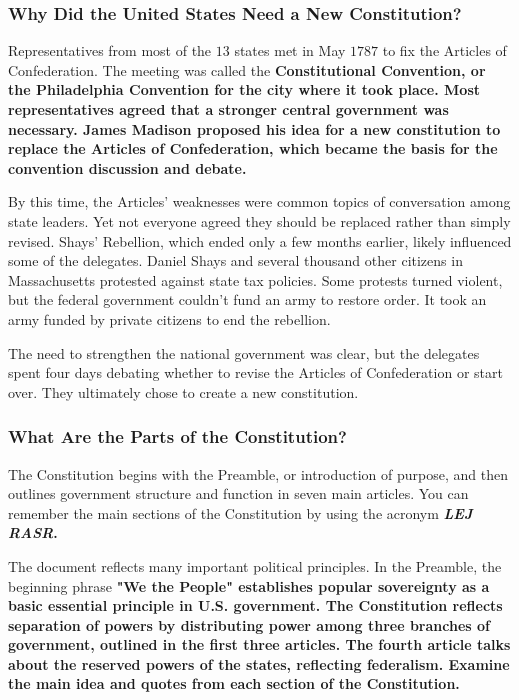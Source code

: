 \newpage

\subsubsection*{Why Did the United States Need a New Constitution?}

Representatives from most of the $13$ states met in May $1787$ to fix the Articles of Confederation. The meeting was called the
\bf{Constitutional Convention}, or the \bf{Philadelphia Convention} for the city where it took place. Most representatives agreed
that a stronger central government was necessary. James Madison proposed his idea for a new constitution to replace the Articles of
Confederation, which became the basis for the convention discussion and debate.

By this time, the Articles' weaknesses were common topics of conversation among state leaders. Yet not everyone agreed they should be
replaced rather than simply revised. Shays' Rebellion, which ended only a few months earlier, likely influenced some of the delegates.
Daniel Shays and several thousand other citizens in Massachusetts protested against state tax policies. Some protests turned violent, but
the federal government couldn't fund an army to restore order. It took an army funded by private citizens to end the rebellion.

The need to strengthen the national government was clear, but the delegates spent four days debating whether to revise the Articles of
Confederation or start over. They ultimately chose to create a new constitution.

\subsubsection*{What Are the Parts of the Constitution?}

The Constitution begins with the Preamble, or introduction of purpose, and then outlines government structure and function in seven main
articles. You can remember the main sections of the Constitution by using the acronym \bf{\it{LEJ RASR}}.

The document reflects many important political principles. In the Preamble, the beginning phrase \bf{"We the People"} establishes
popular sovereignty as a basic essential principle in U.S. government. The Constitution reflects separation of powers by distributing power
among three branches of government, outlined in the first three articles. The fourth article talks about the reserved powers of the states,
reflecting federalism. Examine the main idea and quotes from each section of the Constitution.

